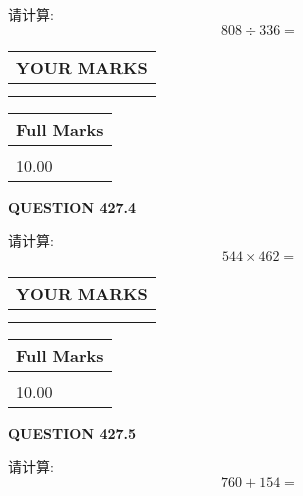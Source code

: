 \documentclass{ctexart}
\begin{document}
  
 
请计算:
\begin{equation}
808  \div    %
336 = \nonumber
\end{equation}
 

 

 
  
\vspace{0.2in}
  
\noindent\begin{tabular}{|l|}
\hline
 YOUR MARKS  \\
\hline
 \\ 
 \\ 
\hline
\end{tabular}
\hspace{0.05in} \begin{tabular}{|l|}
\hline
 Full Marks  \\
\hline
 \\ 
10.00 \\
\hline
\end{tabular}
{\textbf{\Large{QUESTION
427.4 
}}}
  
  
 
请计算:
\begin{equation}
544  \times    %
462 = \nonumber
\end{equation}
 

 

 
  
\vspace{0.2in}
  
\noindent\begin{tabular}{|l|}
\hline
 YOUR MARKS  \\
\hline
 \\ 
 \\ 
\hline
\end{tabular}
\hspace{0.05in} \begin{tabular}{|l|}
\hline
 Full Marks  \\
\hline
 \\ 
10.00 \\
\hline
\end{tabular}
{\textbf{\Large{QUESTION
427.5 
}}}
  
  
 
请计算:
\begin{equation}
760 +  %
154 = \nonumber
\end{equation}
 

 

 
  
\end{document}

